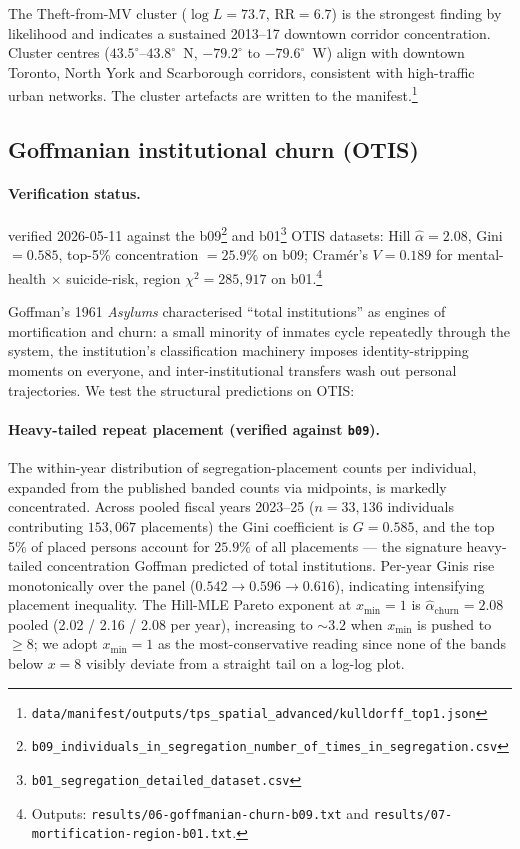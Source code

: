 \documentclass[article,shortnames,nojss]{jss}
\newcommand{\OTIS}{\textsf{OTIS}}
\begin{document}
The Theft-from-MV cluster ($\log L = 73.7$, $\text{RR}=6.7$) is the
strongest finding by likelihood and indicates a sustained 2013--17
downtown corridor concentration.  Cluster centres
($43.5^\circ$--$43.8^\circ$~N, $-79.2^\circ$ to $-79.6^\circ$~W)
align with downtown Toronto, North York and Scarborough corridors,
consistent with high-traffic urban networks.  The cluster
artefacts are written to the manifest.\footnote{\texttt{data/manifest/outputs/tps\_spatial\_advanced/kulldorff\_top1.json}}

\subsection{Goffmanian institutional churn (OTIS)}\label{phys-goffman}


\paragraph*{Verification status.}
verified 2026-05-11 against the b09\footnote{\texttt{b09\_individuals\_in\_segregation\_number\_of\_times\_in\_segregation.csv}} and b01\footnote{\texttt{b01\_segregation\_detailed\_dataset.csv}} \OTIS{} datasets: Hill $\hat\alpha = 2.08$, Gini $= 0.585$, top-5\% concentration $= 25.9\%$ on b09; Cram\'er's $V = 0.189$ for mental-health $\times$ suicide-risk, region $\chi^2 = 285{,}917$ on b01.\footnote{Outputs: \texttt{results/06-goffmanian-churn-b09.txt} and \texttt{results/07-mortification-region-b01.txt}.}

Goffman's 1961 \emph{Asylums} \citep{goffman1961asylums}
characterised ``total institutions'' as engines of mortification
and churn: a small minority of inmates cycle repeatedly through the
system, the institution's classification machinery imposes
identity-stripping moments on everyone, and inter-institutional
transfers wash out personal trajectories.  We test the structural
predictions on OTIS:

\paragraph{Heavy-tailed repeat placement (verified against \texttt{b09}).}
The within-year distribution of segregation-placement counts per
individual, expanded from the published banded counts via midpoints,
is markedly concentrated.  Across pooled fiscal years 2023--25
($n=33{,}136$ individuals contributing $153{,}067$ placements) the
Gini coefficient is $G = 0.585$, and the top 5\% of placed persons
account for $25.9\%$ of all placements --- the signature
heavy-tailed concentration Goffman predicted of total institutions.
Per-year Ginis rise monotonically over the panel
($0.542 \to 0.596 \to 0.616$), indicating intensifying placement
inequality.  The Hill-MLE Pareto exponent at $x_{\min}=1$ is
$\hat\alpha_{\text{churn}} = 2.08$ pooled
(2.02 / 2.16 / 2.08 per year), increasing to $\sim 3.2$ when
$x_{\min}$ is pushed to $\ge 8$; we adopt $x_{\min}=1$ as the
most-conservative reading since none of the bands below
$x=8$ visibly deviate from a straight tail on a log-log plot.
\end{document}
